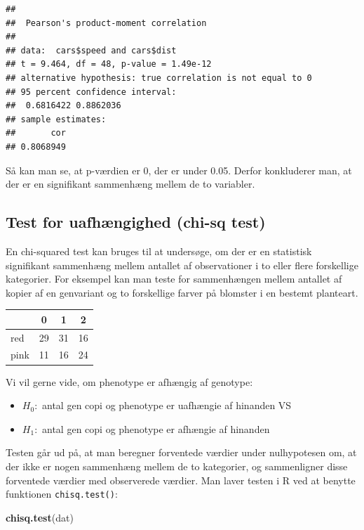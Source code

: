 \documentclass[
]{book}
\newenvironment{Shaded}{\begin{snugshade}}{\end{snugshade}}
\newcommand{\FunctionTok}[1]{\textcolor[rgb]{0.13,0.29,0.53}{\textbf{#1}}}
\newcommand{\NormalTok}[1]{#1}
\providecommand{\tightlist}{%
  \setlength{\itemsep}{0pt}\setlength{\parskip}{0pt}}
\theoremstyle{definition}
\theoremstyle{definition}
\theoremstyle{definition}
\theoremstyle{definition}
\theoremstyle{remark}
\begin{document}
\begin{verbatim}
## 
##  Pearson's product-moment correlation
## 
## data:  cars$speed and cars$dist
## t = 9.464, df = 48, p-value = 1.49e-12
## alternative hypothesis: true correlation is not equal to 0
## 95 percent confidence interval:
##  0.6816422 0.8862036
## sample estimates:
##       cor 
## 0.8068949
\end{verbatim}

Så kan man se, at p-værdien er 0, der er under 0.05. Derfor konkluderer man, at der er en signifikant sammenhæng mellem de to variabler.

\subsection{Test for uafhængighed (chi-sq test)}\label{test-for-uafhuxe6ngighed-chi-sq-test}

En chi-squared test kan bruges til at undersøge, om der er en statistisk signifikant sammenhæng mellem antallet af observationer i to eller flere forskellige kategorier. For eksempel kan man teste for sammenhængen mellem antallet af kopier af en genvariant og to forskellige farver på blomster i en bestemt planteart.

\begin{longtable}[]{@{}lccc@{}}
\toprule\noalign{}
& 0 & 1 & 2 \\
\midrule\noalign{}
\endhead
\bottomrule\noalign{}
\endlastfoot
red & 29 & 31 & 16 \\
pink & 11 & 16 & 24 \\
\end{longtable}

Vi vil gerne vide, om phenotype er afhængig af genotype:

\begin{itemize}
\tightlist
\item
  \(H_{0}:\) antal gen copi og phenotype er uafhængie af hinanden VS
\item
  \(H_{1}:\) antal gen copi og phenotype er afhængie af hinanden
\end{itemize}

Testen går ud på, at man beregner forventede værdier under nulhypotesen om, at der ikke er nogen sammenhæng mellem de to kategorier, og sammenligner disse forventede værdier med observerede værdier. Man laver testen i R ved at benytte funktionen \texttt{chisq.test()}:

\begin{Shaded}
\begin{Highlighting}[]
\FunctionTok{chisq.test}\NormalTok{(dat)}
\end{Highlighting}
\end{Shaded}
\end{document}

